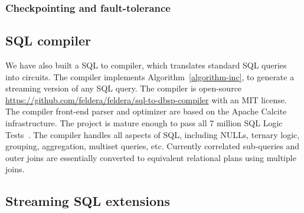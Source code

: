 \subsubsection{Checkpointing and fault-tolerance}

\subsection{SQL compiler}

We have also built a SQL to \dbsp compiler, which translates standard
SQL queries into \dbsp circuits.  The compiler implements
Algorithm~\ref{algorithm-inc}, to generate a streaming version of any
SQL query.  The compiler is open-source
\url{https://github.com/feldera/feldera/sql-to-dbsp-compiler} with
an MIT license.  The compiler front-end parser and optimizer are based
on the Apache Calcite~\cite{begoli-icmd18} infrastructure.  The
project is mature enough to pass all 7 million SQL Logic
Tests~\cite{sqllogictest}.  The compiler handles all aspects of SQL,
including NULLs, ternary logic, grouping, aggregation, multiset
queries, etc.  Currently correlated sub-queries and outer joins are
essentially converted to equivalent relational plans using multiple
joins.

\subsection{Streaming SQL extensions}

